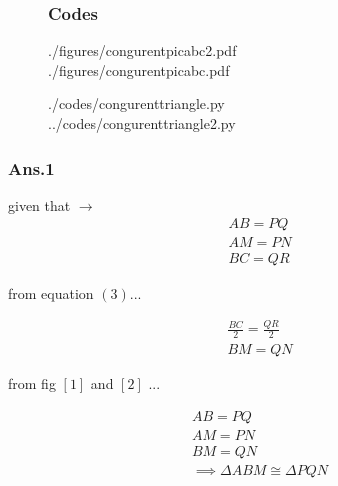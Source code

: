 \documentclass{beamer}
\begin{document}
       \begin{frame}
        \begin{figure}	
        
            	\frametitle{Codes}
        	\item[]
        	\begin{tcolorbox}[colback=blue!5,colframe=blue!40!black,title=latex codes for figures a and b ]
        		
        	  ./figures/congurentpicabc2.pdf \\	
        	  ./figures/congurentpicabc.pdf 
        	\end{tcolorbox}
        	
        	\begin{tcolorbox}[colback=red!5,colframe=blue!40!black,title=python codes for figures a and b ]
        		./codes/congurenttriangle.py \\	
        		../codes/congurenttriangle2.py	 
        	\end{tcolorbox}
        \end{figure}
        \end{frame}
     
     
        \begin{frame}
        	\frametitle{Ans.1}
        	\begin{multicols}{2}
        	given that $\to$\\
        	
        	\begin{align}
        		AB = PQ\\
        		AM = PN\\
        		BC = QR	
        	\end{align}
        	
        	from equation $\left(3\right)$...
        	
        	\begin{align}
        		\frac{BC}{2} = \frac{QR}{2} \\
        		BM = QN
        	\end{align}
       
       		from fig $\left[1\right]$ and $\left[2\right]$ ...
       	
       		\begin{align}
       			AB = PQ\\
       			AM = PN\\
       			BM = QN\\
       			\implies  \Delta ABM \cong \Delta PQN
       		\end{align}
       		\end{multicols}
       \end{frame}
       	
\end{document}
